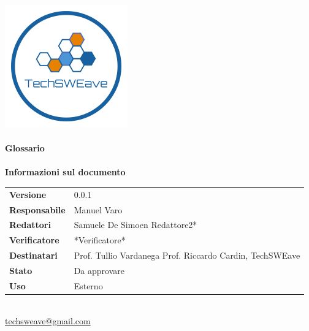 \documentclass[a4paper]{article}
\begin{document}
\begin{titlepage}
    \begin{center}
        \includegraphics{../../../Images/logo}\\
        \vspace{20px}
        \textcolor{logo}{\hrulefill}\\
        \vspace{20px}
        \textbf{\huge\textcolor{logo}{Glossario}}\\
        \vspace{10px}
        \textcolor{logo}{\hrulefill}\\
        \vspace{40px}
        \textbf{\Large Informazioni sul documento}\\
        \vspace{20px}
        \begin{tabular}{p{100px} | p{100px}}
            \textbf{Versione} & 0.0.1\\
            \textbf{Responsabile} & Manuel Varo\\
            \textbf{Redattori} & Samuele De Simoen \newline *Redattore2*\\
            \textbf{Verificatore} & *Verificatore*\\
            \textbf{Destinatari} & Prof. Tullio Vardanega \newline Prof. Riccardo Cardin, \newline TechSWEave\\
            \textbf{Stato} & Da approvare\\
            \textbf{Uso} & Esterno\\
        \end{tabular}\\
        \vspace{60px}
        \href{mailto:techsweave@gmail.com}{techsweave@gmail.com}\\

    \end{center}
    \end{titlepage}
\end{document}
